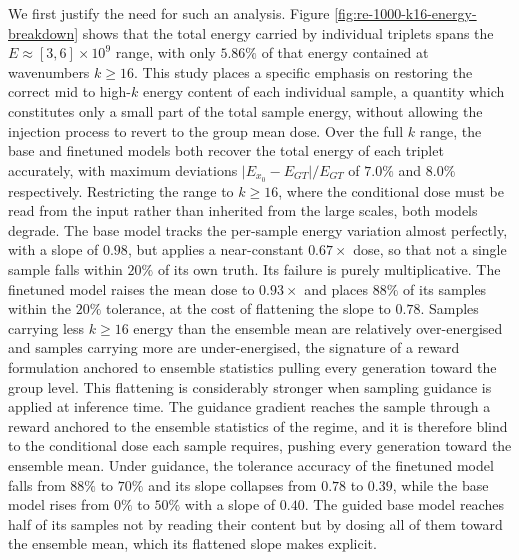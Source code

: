 We first justify the need for such an analysis. Figure
\ref{fig:re-1000-k16-energy-breakdown} shows that the total energy carried by individual
triplets spans the $E\approx[3,6]\times10^{9}$ range, with only $5.86\%$ of that energy
contained at wavenumbers $k\geq16$. This study places a specific emphasis on restoring
the correct mid to high-$k$ energy content of each individual sample, a quantity which
constitutes only a small part of the total sample energy, without allowing the injection
process to revert to the group mean dose. Over the full $k$ range, the base and
finetuned models both recover the total energy of each triplet accurately, with maximum
deviations $\lvert E_{x_0} - E_{GT}\rvert / E_{GT}$ of $7.0\%$ and $8.0\%$ respectively.
Restricting the range to $k\geq16$, where the conditional dose must be read from the
input rather than inherited from the large scales, both models degrade. The base model
tracks the per-sample energy variation almost perfectly, with a slope of $0.98$, but
applies a near-constant $0.67\times$ dose, so that not a single sample falls within
$20\%$ of its own truth. Its failure is purely multiplicative. The finetuned model
raises the mean dose to $0.93\times$ and places $88\%$ of its samples within the
$20\%$ tolerance, at the cost of flattening the slope to $0.78$. Samples carrying less
$k\geq16$ energy than the ensemble mean are relatively over-energised and samples
carrying more are under-energised, the signature of a reward formulation anchored to
ensemble statistics pulling every generation toward the group level.\newline
This flattening is considerably stronger when sampling guidance is applied at inference
time. The guidance gradient reaches the sample through a reward anchored to the
ensemble statistics of the regime, and it is therefore blind to the conditional dose
each sample requires, pushing every generation toward the ensemble mean. Under
guidance, the tolerance accuracy of the finetuned model falls from $88\%$ to $70\%$ and
its slope collapses from $0.78$ to $0.39$, while the base model rises from $0\%$ to
$50\%$ with a slope of $0.40$. The guided base model reaches half of its samples not by
reading their content but by dosing all of them toward the ensemble mean, which its
flattened slope makes explicit.\newline
